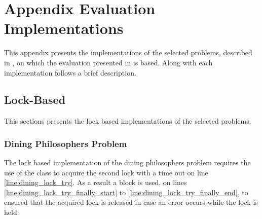 \chapter[]{Appendix Evaluation Implementations}
This appendix presents the implementations of the selected problems, described in , on which the evaluation presented in  is based. Along with each implementation follows a brief description.
\label{app:eval_implementations}

\section{Lock-Based}\label{app:impl_lockbased}
This sections presents the lock based implementations of the selected problems.

\subsection{Dining Philosophers Problem}
The lock based implementation of the dining philosophers problem requires the use of the  class to acquire the second lock with a time out on line \ref{line:dining_lock_try}. As a result a  block is used, on lines \ref{line:dining_lock_try_finally_start} to \ref{line:dining_lock_try_finally_end}, to ensured that the acquired lock is released in case an error occurs while the lock is held.
